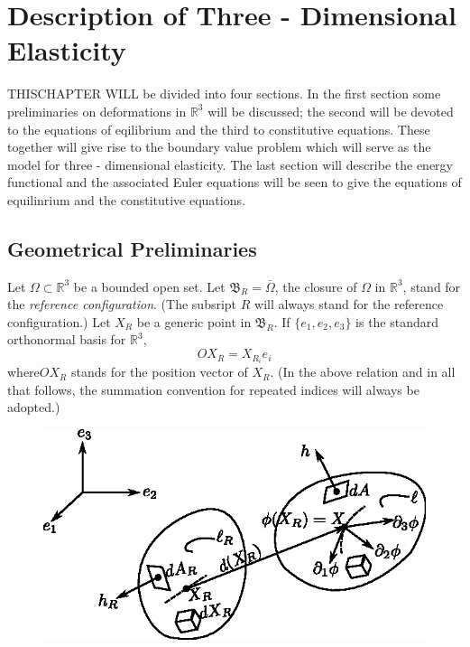 \chapter{Description of Three - Dimensional Elasticity}\label{chap1}

THIS\pageoriginale  CHAPTER WILL be divided into four sections. In the
first section 
some preliminaries on deformations in $\mathbb{R}^3$ will be
discussed; the second will be devoted to the equations of eqilibrium
and the third to constitutive equations. These together will give rise
to the boundary value problem which will serve as the model for three
- dimensional elasticity. The last section will describe the energy
functional and the associated Euler equations will be seen to give the
equations of equilinrium and the constitutive equations. 

\section{Geometrical Preliminaries}\label{chap1-sec1.1} %

Let $\Omega \subset \mathbb{R}^3$ be a bounded open set. Let
$\mathfrak{B}_R = \bar{\Omega}$, the closure of $\Omega$ in
$\mathbb{R}^3$, stand for the \textit{reference configuration}. (The
subsript $R$ will always stand for the reference configuration.) Let
$X_R$ be a generic point in $\mathfrak{B}_R$. If $\{e_1, e_2, e_3 \}$
is the standard orthonormal basis for $\mathbb{R}^3$,  
\begin{equation*}
OX_R = X_{R_i} e_i \tag{1.1-1}\label{eq1.1-1}
\end{equation*}
where\pageoriginale  $OX_R$ stands for the position vector of
$X_R$. (In the above 
relation and in all that follows, the summation convention for
repeated indices will always be adopted.) 

\begin{figure}[H]
\centering
\includegraphics{vol71-figures/fig1.1-1.eps}
\medskip
\caption{}\label{fig1.1.1}
\end{figure}


